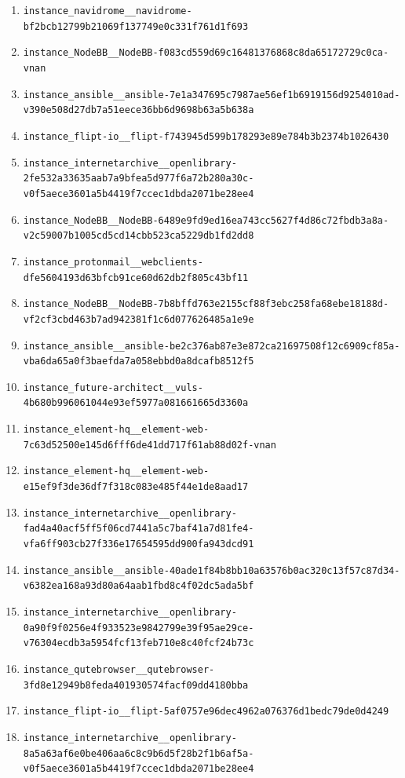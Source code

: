 \documentclass{llmxive}
\begin{document}
\begin{enumerate}
\item \texttt{instance\_navidrome\_\_navidrome-bf2bcb12799b21069f137749e0c331f761d1f693}
\item \texttt{instance\_NodeBB\_\_NodeBB-f083cd559d69c16481376868c8da65172729c0ca-vnan}
\item \texttt{instance\_ansible\_\_ansible-7e1a347695c7987ae56ef1b6919156d9254010ad-v390e508d27db7a51eece36bb6d9698b63a5b638a}
\item \texttt{instance\_flipt-io\_\_flipt-f743945d599b178293e89e784b3b2374b1026430}
\item \texttt{instance\_internetarchive\_\_openlibrary-2fe532a33635aab7a9bfea5d977f6a72b280a30c-v0f5aece3601a5b4419f7ccec1dbda2071be28ee4}
\item \texttt{instance\_NodeBB\_\_NodeBB-6489e9fd9ed16ea743cc5627f4d86c72fbdb3a8a-v2c59007b1005cd5cd14cbb523ca5229db1fd2dd8}
\item \texttt{instance\_protonmail\_\_webclients-dfe5604193d63bfcb91ce60d62db2f805c43bf11}
\item \texttt{instance\_NodeBB\_\_NodeBB-7b8bffd763e2155cf88f3ebc258fa68ebe18188d-vf2cf3cbd463b7ad942381f1c6d077626485a1e9e}
\item \texttt{instance\_ansible\_\_ansible-be2c376ab87e3e872ca21697508f12c6909cf85a-vba6da65a0f3baefda7a058ebbd0a8dcafb8512f5}
\item \texttt{instance\_future-architect\_\_vuls-4b680b996061044e93ef5977a081661665d3360a}
\item \texttt{instance\_element-hq\_\_element-web-7c63d52500e145d6fff6de41dd717f61ab88d02f-vnan}
\item \texttt{instance\_element-hq\_\_element-web-e15ef9f3de36df7f318c083e485f44e1de8aad17}
\item \texttt{instance\_internetarchive\_\_openlibrary-fad4a40acf5ff5f06cd7441a5c7baf41a7d81fe4-vfa6ff903cb27f336e17654595dd900fa943dcd91}
\item \texttt{instance\_ansible\_\_ansible-40ade1f84b8bb10a63576b0ac320c13f57c87d34-v6382ea168a93d80a64aab1fbd8c4f02dc5ada5bf}
\item \texttt{instance\_internetarchive\_\_openlibrary-0a90f9f0256e4f933523e9842799e39f95ae29ce-v76304ecdb3a5954fcf13feb710e8c40fcf24b73c}
\item \texttt{instance\_qutebrowser\_\_qutebrowser-3fd8e12949b8feda401930574facf09dd4180bba}
\item \texttt{instance\_flipt-io\_\_flipt-5af0757e96dec4962a076376d1bedc79de0d4249}
\item \texttt{instance\_internetarchive\_\_openlibrary-8a5a63af6e0be406aa6c8c9b6d5f28b2f1b6af5a-v0f5aece3601a5b4419f7ccec1dbda2071be28ee4}

\end{enumerate}
\end{document}
